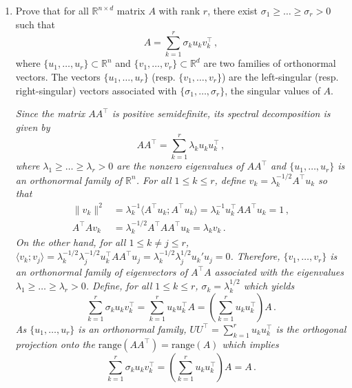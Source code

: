 \documentclass[a4paper,10pt,fleqn]{article}
\newcommand{\eqsp}{\,}
\newcommand{\rset}{\ensuremath{\mathbb{R}}}
\newcommand{\1}{\ensuremath{\mathbbm{1}}}
\newcommand{\bfU}{U}
\newcommand{\bfA}{A}
\newcommand{\bfV}{V}
\begin{document}
\begin{enumerate}
\item Prove that for all $\rset^{n \times d}$ matrix $\bfA$ with rank $r$, there exist $\sigma_1\geqslant \ldots \geqslant \sigma_r>0$ such that
$$
\bfA = \sum_{k=1}^r \sigma_k u_k v^\top_k\eqsp,
$$
where $\{u_1,\ldots,u_r\}\subset \rset^n$ and $\{v_1,\ldots,v_r \} \subset \rset^d$ are two families of orthonormal  vectors. The vectors $\{u_1,\ldots,u_r\}$  (resp. $\{v_1,\ldots,v_r\}$) are the left-singular (resp. right-singular) vectors associated with $\{\sigma_1,\ldots,\sigma_r\}$, the singular values of $\bfA$.

\vspace{.2cm}

{\em
Since the matrix $\bfA\bfA^\top$ is positive semidefinite, its spectral decomposition is given by
$$
\bfA\bfA^\top = \sum_{k=1}^r \lambda_k u_k u^\top_k\eqsp,
$$
where $\lambda_1\geqslant \ldots\geqslant \lambda_r>0$ are the nonzero eigenvalues of $\bfA\bfA^\top$ and $\{u_1,\ldots,u_r\}$ is an orthonormal family of $\rset^n$. For all $1\leqslant k\leqslant r$, define $v_k = \lambda_k^{-1/2}\bfA^\top u_k$ so that
\begin{align*}
\|v_k\|^2&=\lambda_k^{-1}\langle \bfA^\top u_k;\bfA^\top u_k\rangle = \lambda_k^{-1} u^\top_k\bfA\bfA^\top u_k = 1\eqsp, \\
\bfA^\top\bfA v_k & = \lambda_k^{-1/2}\bfA^\top \bfA \bfA^\top u_k  = \lambda_k v_k\eqsp.
\end{align*}
On the other hand, for all $1\leqslant k\neq j\leqslant r$, $\langle v_k;v_j\rangle = \lambda_k^{-1/2}\lambda_j^{-1/2}u^\top_k\bfA\bfA^\top u_j =\lambda_k^{-1/2}\lambda_j^{1/2}u_k'u_j = 0$. Therefore, $\{v_1,\ldots,v_r\}$ is an orthonormal family of eigenvectors of $\bfA^\top\bfA$ associated with the eigenvalues $\lambda_1\geqslant \ldots\geqslant \lambda_r>0$.
Define, for all $1\leqslant k\leqslant r$, $\sigma_k = \lambda_k^{1/2}$ which yields
$$
\sum_{k=1}^r \sigma_k u_k v^\top_k = \sum_{k=1}^r  u_k u^\top_k\bfA = \left(\sum_{k=1}^r  u_k u^\top_k\right)\bfA\eqsp.
$$
As $\{u_1,\ldots,u_r\}$ is an orthonormal family, $\bfU\bfU^\top = \sum_{k=1}^r u_ku^\top_k$ is the orthogonal projection onto the $\mathrm{range}(\bfA\bfA^\top) = \mathrm{range}(\bfA)$ which implies
$$
\sum_{k=1}^r \sigma_k u_k v^\top_k = \left(\sum_{k=1}^r  u_k u^\top_k\right)\bfA = \bfA\eqsp.
$$
}

\end{enumerate}
\end{document}
